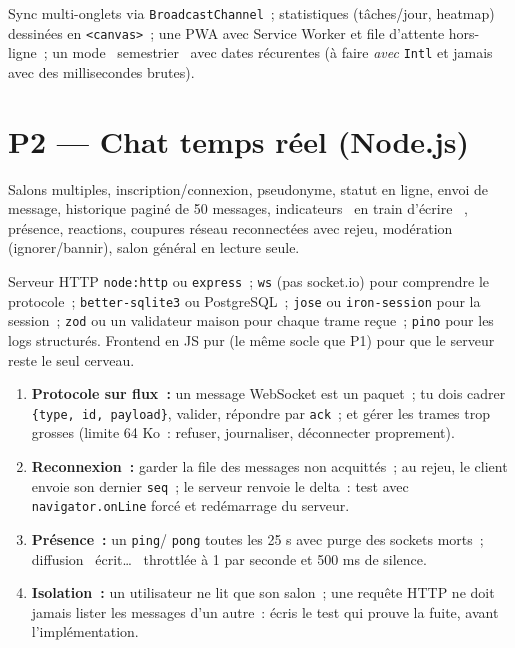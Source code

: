 Sync multi-onglets via \verb|BroadcastChannel|~; statistiques (t\^aches/jour, heatmap) dessin\'ees en
\verb|<canvas>|~; une PWA avec Service Worker et file d'attente hors-ligne~; un mode \og ~semestrier~ \fg{}
avec dates r\'ecurentes (\`a faire \emph{avec} \verb|Intl| et jamais avec des millisecondes brutes).

\section{P2 --- Chat temps r\'eel (Node.js)}

Salons multiples, inscription/connexion, pseudonyme, statut en ligne, envoi de message, historique
pagin\'e de 50 messages, indicateurs \og ~en train d'\'ecrire~ \fg{}, pr\'esence, reactions, coupures r\'eseau
reconnect\'ees avec rejeu, mod\'eration (ignorer/bannir), salon g\'en\'eral en lecture seule.

Serveur HTTP \verb|node:http| ou \verb|express|~; \verb|ws| (pas socket.io) pour comprendre le
protocole~; \verb|better-sqlite3| ou PostgreSQL~; \verb|jose| ou \verb|iron-session| pour la session~;
\verb|zod| ou un validateur maison pour chaque trame re\c{c}ue~; \verb|pino| pour les logs structur\'es.
Frontend en JS pur (le m\^eme socle que P1) pour que le serveur reste le seul cerveau.

\begin{enumerate}
  \item \textbf{Protocole sur flux~:} un message WebSocket est un paquet~; tu dois cadrer
        \verb|{type, id, payload}|, valider, r\'epondre par \verb|ack|~; et g\'erer les trames
        trop grosses (limite 64 Ko~: refuser, journaliser, d\'econnecter proprement).
  \item \textbf{Reconnexion~:} garder la file des messages non acquitt\'es~; au rejeu, le client
        envoie son dernier \verb|seq|~; le serveur renvoie le delta~: test avec
        \verb|navigator.onLine| forc\'e et red\'emarrage du serveur.
  \item \textbf{Pr\'esence~:} un \verb|ping|/ \verb|pong| toutes les 25 s avec purge des sockets
        morts~; diffusion \og ~\'ecrit\ldots~ \fg{} throttl\'ee \`a 1 par seconde et 500 ms de silence.
  \item \textbf{Isolation~:} un utilisateur ne lit que son salon~; une requ\^ete HTTP ne doit jamais
        lister les messages d'un autre~: \'ecris le test qui prouve la fuite, avant l'impl\'ementation.
\end{enumerate}

